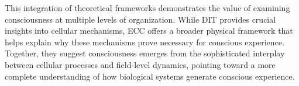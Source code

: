 This integration of theoretical frameworks demonstrates the value of examining consciousness at multiple levels of organization. While DIT provides crucial insights into cellular mechanisms, ECC offers a broader physical framework that helps explain why these mechanisms prove necessary for conscious experience. Together, they suggest consciousness emerges from the sophisticated interplay between cellular processes and field-level dynamics, pointing toward a more complete understanding of how biological systems generate conscious experience.